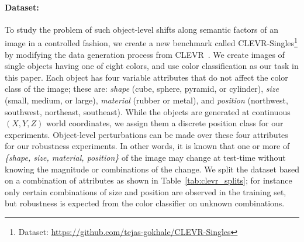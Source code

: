     \paragraph{Dataset:}

    To study the problem of such object-level shifts along semantic factors of an image in a controlled fashion, we create a new benchmark called CLEVR-Singles\footnote{
        Dataset: \url{https://github.com/tejas-gokhale/CLEVR-Singles}} 
    by modifying the data generation process from CLEVR~\citep{johnson2017clevr}.
    We create images of single objects having one of eight colors, and use color classification as our task in this paper.
    Each object has four variable attributes that do not affect the color class of the image; these are: \textit{shape} (cube, sphere, pyramid, or cylinder), \textit{size} (small, medium, or large), \textit{material} (rubber or metal), and \textit{position} (northwest, southwest, northeast, southeast).
    While the objects are generated at continuous $(X, Y, Z)$ world coordinates, we assign them a discrete position class for our experiments.
    Object-level perturbations can be made over these four attributes for our robustness experiments.
    In other words, it is known that one or more of \textit{\{shape, size, material, position\}} of the image may change at test-time without knowing the magnitude or combinations of the change.
    We split the dataset based on a combination of attributes as shown in Table~\ref{tab:clevr_splits}; for instance only certain combinations of size and position are observed in the training set, but robustness is expected from the color classifier on unknown combinations.

